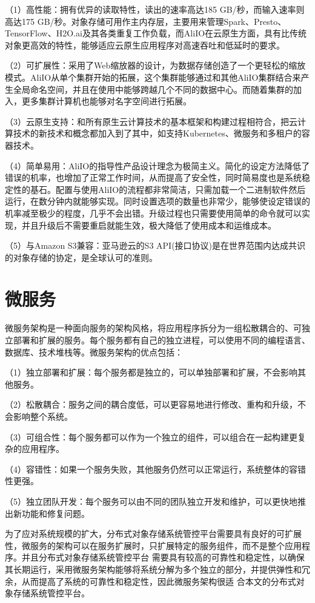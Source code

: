 （1）高性能：拥有优异的读取特性，读出的速率高达185 GB/秒，而输入速率则高达175 GB/秒。对象存储可用作主内存层，主要用来管理Spark、Presto、TensorFlow、H2O.ai及其各类重复工作负载，而AliIO在云原生方面，具有比传统对象更高效的特性，能够适应云原生应用程序对高速吞吐和低延时的要求。

（2）可扩展性：采用了Web缩放器的设计，为数据存储创造了一个更轻松的缩放模式。AliIO从单个集群开始的拓展，这个集群能够通过和其他AliIO集群结合来产生全局命名空间，并且在使用中能够跨越几个不同的数据中心。而随着集群的加入，更多集群计算机也能够对名字空间进行拓展。

（3）云原生支持：和所有原生云计算技术的基本框架和构建过程相符合，把云计算技术的新技术和概念都加入到了其中，如支持Kubernetes、微服务和多租户的容器技术。

（4）简单易用：AliIO的指导性产品设计理念为极简主义。简化的设定方法降低了错误的机率，也增加了正常工作时间，从而提高了安全性，同时简易度也是系统稳定性的基石。配置与使用AliIO的流程都非常简洁，只需加载一个二进制软件然后运行，在数分钟内就能够实现。同时设置选项的数量也非常少，能够使设定错误的机率减至极少的程度，几乎不会出错。升级过程也只需要使用简单的命令就可以实现，并且升级后不需要重启就能生效，极大降低了使用成本和运维成本。

（5）与Amazon S3兼容：亚马逊云的S3 API(接口协议)是在世界范围内达成共识的对象存储的协定\cite{kongq2eji}，是全球认可的准则。




\section{微服务}


微服务架构是一种面向服务的架构风格，将应用程序拆分为一组松散耦合的、可独立部署和扩展的服务\cite{koyong2015keji}。每个服务都有自己的独立进程，可以使用不同的编程语言、数据库、技术堆栈等。微服务架构的优点包括：

（1）独立部署和扩展：每个服务都是独立的，可以单独部署和扩展，不会影响其他服务。

（2）松散耦合：服务之间的耦合度低，可以更容易地进行修改、重构和升级，不会影响整个系统。

（3）可组合性：每个服务都可以作为一个独立的组件，可以组合在一起构建更复杂的应用程序。

（4）容错性：如果一个服务失败，其他服务仍然可以正常运行，系统整体的容错性更强。

（5）独立团队开发：每个服务可以由不同的团队独立开发和维护，可以更快地推出新功能和修复问题。

为了应对系统规模的扩大，分布式对象存储系统管控平台需要具有良好的可扩展性，微服务的架构可以在服务扩展时，只扩展特定的服务组件，而不是整个应用程序。并且分布式对象存储系统管控平台
需要具有较高的可靠性和稳定性，以确保其长期运行，采用微服务架构能够将系统分解为多个独立的部分，并提供弹性和冗余，从而提高了系统的可靠性和稳定性，因此微服务架构很适
合本文的分布式对象存储系统管控平台。

